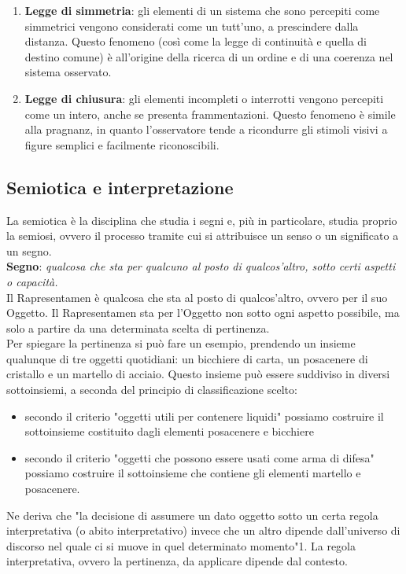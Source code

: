 \documentclass[11pt,a4paper]{article}
\begin{document}
\begin{enumerate}
	\item \textbf{Legge di simmetria}: gli elementi di un sistema che sono percepiti come simmetrici vengono considerati come un tutt'uno, a prescindere dalla distanza. Questo fenomeno (così come la legge di continuità e quella di destino comune) è all'origine della ricerca di un ordine e di una coerenza nel sistema osservato.
	\item \textbf{Legge di chiusura}: gli elementi incompleti o interrotti vengono percepiti come un intero, anche se presenta frammentazioni. Questo fenomeno è simile alla pragnanz, in quanto l'osservatore tende a ricondurre gli stimoli visivi a figure semplici e facilmente riconoscibili.
\end{enumerate}
\subsection{Semiotica e interpretazione}
La semiotica è la disciplina che studia i segni e, più in particolare, studia proprio la semiosi, ovvero il processo tramite cui si attribuisce un senso o un significato a un segno. \\
\textbf{Segno}: \textit{qualcosa che sta per qualcuno al posto di qualcos'altro, sotto certi aspetti o capacità.} \\
Il Rapresentamen è qualcosa che sta al posto di qualcos'altro, ovvero per il suo Oggetto. Il Rapresentamen sta per l'Oggetto non sotto ogni aspetto possibile, ma solo a partire da una determinata scelta di pertinenza. \\
Per spiegare la pertinenza si può fare un esempio, prendendo un insieme qualunque di tre oggetti quotidiani: un bicchiere di carta, un posacenere di cristallo e un martello di acciaio. Questo insieme può essere suddiviso in diversi sottoinsiemi, a seconda del principio di classificazione scelto:
\begin{itemize}
	\item secondo il criterio "oggetti utili per contenere liquidi" possiamo costruire il sottoinsieme costituito dagli elementi posacenere e bicchiere
	\item secondo il criterio "oggetti che possono essere usati come arma di difesa" possiamo costruire il sottoinsieme che contiene gli elementi martello e posacenere.
\end{itemize}
Ne deriva che "la decisione di assumere un dato oggetto sotto un certa regola interpretativa (o abito interpretativo) invece che un altro dipende dall'universo di discorso nel quale ci si muove in quel determinato momento"1. La regola interpretativa, ovvero la pertinenza, da applicare dipende dal contesto. \\
\end{document}

